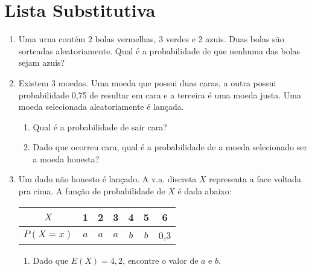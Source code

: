 \pagestyle{cap1}

\section*{Lista Substitutiva}

\begin{enumerate}
\item Uma urna contém 2 bolas vermelhas, 3 verdes e 2 azuis. Duas bolas são sorteadas aleatoriamente. Qual é a probabilidade de que nenhuma das bolas sejam azuis?

\item Existem 3 moedas. Uma moeda que possui duas caras, a outra possui probabilidade 0,75 de resultar em cara e a terceira é uma moeda justa.
Uma moeda selecionada aleatoriamente é lançada.

	\begin{enumerate}[label=\alph*.]
    		\item Qual é a probabilidade de sair cara?
		
		\item Dado que ocorreu cara, qual é a probabilidade de a moeda selecionado ser a moeda honesta?
	\end{enumerate}

\item Um dado não honesto é lançado. A v.a. discreta $X$ representa a face voltada pra cima. A função de probabilidade de $X$ é dada abaixo:

    \begin{center}
        \begin{tabular}{|c|c|c|c|c|c|c|}
            \hline
            $X$          & 1 & 2  & 3 & 4 & 5 & 6 \\ \hline
            $P(X=x)$ & $a$ & $a$ & $a$ & $b$ & $b$ & 0,3 \\ \hline
        \end{tabular}
    \end{center}

	\solv{
		\[\sum\limits_{i=1}^np(x_{i}) = 1;\ E(X) = \sum^{n}_{i=1} x_{i}p(x_{i});\ E(X^{2}) = \sum^{n}_{i=1} x_{i}^{2}p(x_{i});\ Var(X) = E(X^{2}) - [E(X)]^{2}\]
	}
	\begin{enumerate}[label=\alph*.]
		\item Dado que $E(X) = 4,2$, encontre o valor de $a$ e $b$.
		
\end{enumerate}
\end{enumerate}
